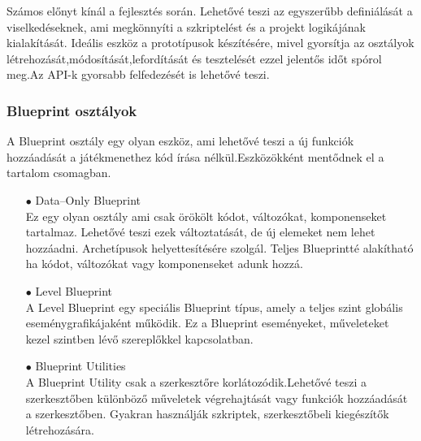 \documentclass[
]{thesis-ekf}
\theoremstyle{definition}
\theoremstyle{remark}
\begin{document}
Számos előnyt kínál a fejlesztés során. Lehetővé teszi az egyszerűbb definiálását a viselkedéseknek, ami megkönnyíti a szkriptelést és a projekt logikájának kialakítását. Ideális eszköz a prototípusok készítésére, mivel gyorsítja az osztályok létrehozását,módosítását,lefordítását és tesztelését ezzel jelentős időt spórol meg.Az API-k gyorsabb felfedezését is lehetővé teszi.
\subsubsection{Blueprint osztályok}
A Blueprint osztály egy olyan eszköz, ami lehetővé teszi a új funkciók hozzáadását a játékmenethez kód írása nélkül.Eszközökként mentődnek el a tartalom csomagban.
\begin{itemize}
	\item[$\bullet$] Data--Only Blueprint \\ Ez egy olyan osztály ami csak örökölt kódot, változókat, komponenseket tartalmaz. Lehetővé teszi ezek változtatását, de új elemeket nem lehet hozzáadni. Archetípusok helyettesítésére szolgál. Teljes Blueprintté alakítható ha kódot, változókat vagy komponenseket adunk hozzá.
	\item[$\bullet$] Level Blueprint \\ A Level Blueprint egy speciális Blueprint típus, amely a teljes szint globális eseménygrafikájaként működik. Ez a Blueprint eseményeket, műveleteket kezel szintben lévő szereplőkkel kapcsolatban.
	\item[$\bullet$] Blueprint Utilities \\ A Blueprint Utility csak a szerkesztőre korlátozódik.Lehetővé teszi a szerkesztőben különböző  műveletek végrehajtását vagy funkciók hozzáadását a szerkesztőben. Gyakran használják szkriptek, szerkesztőbeli kiegészítők létrehozására. 
\end{itemize}
\end{document}
